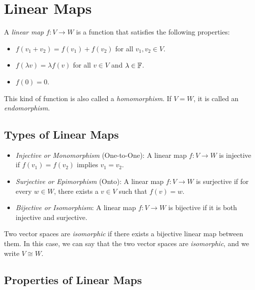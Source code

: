 \chapter{Linear Maps}

A \emph{linear map} \( f: V \to W \) is a function that satisfies the following properties:

\begin{itemize}
    
    \item \( f(v_1 + v_2) = f(v_1) + f(v_2) \) for all \( v_1, v_2 \in V \).
    
    \item \( f(\lambda v) = \lambda f(v) \) for all \( v \in V \) and \( \lambda \in \mathbb{F} \).
    
    \item \( f(0) = 0 \).

\end{itemize} 

This kind of function is also called a \emph{homomorphism}. If \(V = W\), it is called an \emph{endomorphism}.

\section{Types of Linear Maps}

\begin{itemize}
    
    \item \emph{Injective or Monomorphism} (One-to-One): A linear map \( f: V \to W \) is injective if 
          \( f(v_1) = f(v_2) \) implies \( v_1 = v_2 \).
    
    \item \emph{Surjective or Epimorphism} (Onto): A linear map \( f: V \to W \) is surjective if for 
          every \( w \in W \), there exists a \( v \in V \) such that \( f(v) = w \).
    
    \item \emph{Bijective or Isomorphism}: A linear map \( f: V \to W \) is bijective if it is both 
          injective and surjective.

\end{itemize}

Two vector spaces are \emph{isomorphic} if there exists a bijective linear map between them. In this case, we can say 
that the two vector spaces are \emph{isomorphic}, 
and we write \( V \cong W \).

\section{Properties of Linear Maps}

